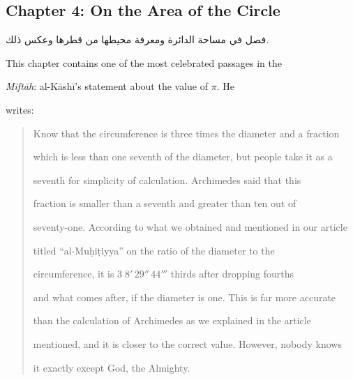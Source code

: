 \documentclass[11pt,a4paper]{article}
\newenvironment{arabicbox}{%

  \begin{framed}

  \begin{minipage}{\linewidth-2\fboxsep-2\fboxrule}

  \setlength{\parindent}{0pt}

  \linespread{1.3}\selectfont

}{%

  \end{minipage}

  \end{framed}

}
\begin{document}
\subsection{Chapter 4: On the Area of the Circle}



\begin{arabicbox}

\begin{Arabic}

فصل في مساحة الدائرة ومعرفة محيطها من قطرها وعكس ذلك.

\end{Arabic}

\end{arabicbox}



\vspace{0.3cm}



This chapter contains one of the most celebrated passages in the

\textit{Mift\=ah}: al-K\=ash\=i's statement about the value of $\pi$. He

writes:



\begin{quote}

Know that the circumference is three times the diameter and a fraction

which is less than one seventh of the diameter, but people take it as a

seventh for simplicity of calculation. Archimedes said that this

fraction is smaller than a seventh and greater than ten out of

seventy-one. According to what we obtained and mentioned in our article

titled ``al-Mu\d{h}i\d{t}iyya'' on the ratio of the diameter to the

circumference, it is $3\;8'\,29''\,44'''$ thirds after dropping fourths

and what comes after, if the diameter is one. This is far more accurate

than the calculation of Archimedes as we explained in the article

mentioned, and it is closer to the correct value. However, nobody knows

it exactly except God, the Almighty.

\end{quote}
\end{document}
